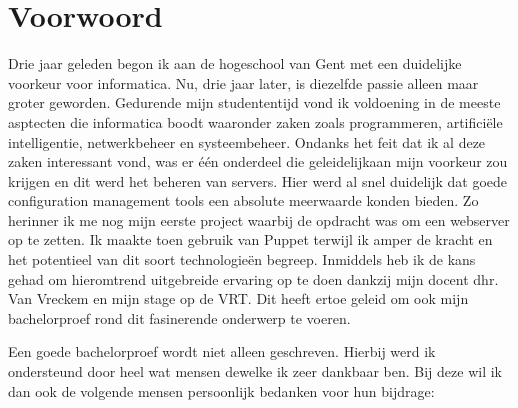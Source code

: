 
\chapter*{Voorwoord}
\label{ch:voorwoord}


Drie jaar geleden begon ik aan de hogeschool van Gent met een duidelijke voorkeur voor informatica. Nu, drie jaar later, is diezelfde passie alleen maar groter geworden. Gedurende mijn studententijd vond ik voldoening in de meeste asptecten die informatica boodt waaronder zaken zoals programmeren, artifici\"ele intelligentie, netwerkbeheer en systeembeheer. Ondanks het feit dat ik al deze zaken interessant vond, was er \'e\'en onderdeel die geleidelijkaan mijn voorkeur zou krijgen en dit werd het beheren van servers.
 \newline
Hier werd al snel duidelijk dat goede configuration management tools een absolute meerwaarde konden bieden. Zo herinner ik me nog mijn eerste project waarbij de opdracht was om een webserver op te zetten. Ik maakte toen gebruik van Puppet terwijl ik amper de kracht en het potentieel van dit soort technologie\"en begreep. Inmiddels heb ik de kans gehad om hieromtrend uitgebreide ervaring op te doen dankzij mijn docent dhr. Van Vreckem en mijn stage op de VRT. Dit heeft ertoe geleid om ook mijn bachelorproef rond dit fasinerende onderwerp te voeren.\newline

Een goede bachelorproef wordt niet alleen geschreven. Hierbij werd ik ondersteund door heel wat mensen dewelke ik zeer dankbaar ben. Bij deze wil ik dan ook de volgende mensen persoonlijk bedanken voor hun bijdrage:

